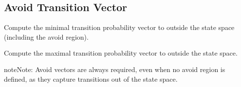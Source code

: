 \documentclass[a4paper,10pt,english]{sphinxmanual}
\begin{document}
\begin{fulllineitems}
\begin{fulllineitems}
\end{fulllineitems}



\subsection{Avoid Transition Vector}
\label{\detokenize{api/imdp:avoid-transition-vector}}

\begin{fulllineitems}
\label{\detokenize{api/imdp:_CPPv4N4IMDP24minAvoidTransitionVectorEv}}\label{\detokenize{api/imdp:_CPPv3N4IMDP24minAvoidTransitionVectorEv}}\label{\detokenize{api/imdp:_CPPv2N4IMDP24minAvoidTransitionVectorEv}}\label{\detokenize{api/imdp:IMDP::minAvoidTransitionVector}}
\pysigstartsignatures
\pysigstartmultiline
\pysiglinewithargsret
{}
{}
{}
\pysigstopmultiline
\pysigstopsignatures
\sphinxAtStartPar
Compute the minimal transition probability vector to outside the state space
(including the avoid region).

\end{fulllineitems}


\begin{fulllineitems}
\label{\detokenize{api/imdp:_CPPv4N4IMDP24maxAvoidTransitionVectorEv}}\label{\detokenize{api/imdp:_CPPv3N4IMDP24maxAvoidTransitionVectorEv}}\label{\detokenize{api/imdp:_CPPv2N4IMDP24maxAvoidTransitionVectorEv}}\label{\detokenize{api/imdp:IMDP::maxAvoidTransitionVector}}
\pysigstartsignatures
\pysigstartmultiline
\pysiglinewithargsret
{}
{}
{}
\pysigstopmultiline
\pysigstopsignatures
\sphinxAtStartPar
Compute the maximal transition probability vector to outside the state space.

\end{fulllineitems}


\begin{sphinxadmonition}{note}{Note:}
\sphinxAtStartPar
Avoid vectors are always required, even when no avoid region is defined, as they
capture transitions out of the state space.
\end{sphinxadmonition}



\end{fulllineitems}
\end{document}
